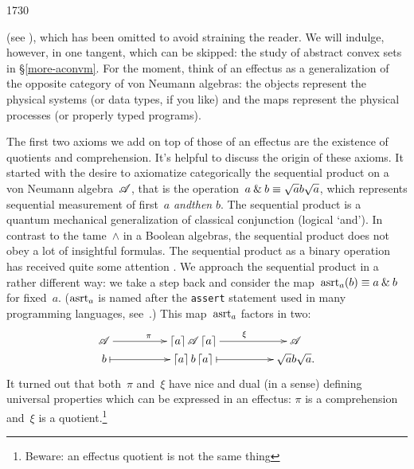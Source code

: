 \begin{parsec}{1730}
\begin{point}{30}
    (see \cite{effintro}), which has been omitted
    to avoid straining the reader.
    We will indulge, however,
    in one tangent,
    which can be skipped:
    the study of abstract convex sets in
    \S\ref{more-aconvm}.
For the moment, think of an effectus as a generalization
    of the opposite category of von Neumann algebras:
    the objects represent the physical systems
    (or data types, if you like)
    and the maps represent the physical processes
    (or properly typed programs).
\end{point}
\begin{point}{40}%
The first two axioms we add on top of those of an effectus
    are the existence of quotients and comprehension.
It's helpful to discuss the origin of these axioms.
It started with the desire to axiomatize categorically
    the sequential product on a von Neumann algebra~$\mathscr{A}$,
    that is the operation~$a \mathbin{\&} b \equiv  \sqrt{a} b \sqrt{a}$,
    which represents sequential measurement
    of first~$a$ \emph{andthen} $b$.
The sequential product is a quantum mechanical generalization
    of classical conjunction (logical `and').
In  contrast to the tame~$\wedge$ in a Boolean algebras,
    the sequential product does not obey a lot of insightful
    formulas.
The sequential product as a binary operation
        has received quite some attention \cite{gudder2008characterization,gheondea2004sequential,gudder2001sequential,li2011sequential,gudder2005open,shen2009not,gudder2005uniqueness,jun2009remarks,weihua2009uniqueness,tkadlec2008atomic,jia2010entropy,arias2004almost}.
We approach the sequential product in a rather different way:
    we take a step back and
    consider the map~$\mathrm{asrt}_a(b) \equiv  a \mathbin{\&} b$
        for fixed~$a$.  ($\mathrm{asrt}_a$ is named after the \texttt{assert} statement
                    used in many programming languages,
                    see~.)
    This map~$\mathrm{asrt}_a$ factors in two:
\begin{equation*}
    \xymatrix@C+2pc@R-2pc{
        \scrA \ar[r]^\pi & \ceil{a} \scrA \ceil{a} \ar[r]^\xi
        & \scrA \\
        b \ar@{|->}[r] & \ceil{a}b\ceil{a}
            \ar@{|->}[r] & \sqrt{a}b\sqrt{a}.
    }
\end{equation*}
It turned out that both~$\pi$ and~$\xi$ have
    nice and dual (in a sense) defining universal properties
    which can be expressed in an effectus:
    $\pi$ is a comprehension and~$\xi$ is a quotient.\footnote{%
            Beware: an effectus quotient is not the same thing
}
\end{point}
\end{parsec}
